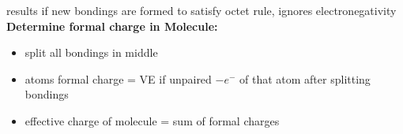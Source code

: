 results if new bondings are formed to satisfy octet rule, ignores electronegativity\\
\textbf{Determine formal charge in Molecule:}
\begin{itemize}
    \itemsep0em
    \item split all bondings in middle
    \item atoms formal charge = VE if unpaired $- e^-$ of that atom after splitting bondings
    \item effective charge of molecule = sum of formal charges
\end{itemize}
